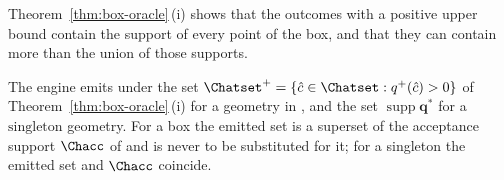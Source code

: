 
Theorem~\ref{thm:box-oracle}\,(i) shows that the outcomes with a positive upper bound
contain the support of every point of the box, and that they can contain more
than the union of those supports.

\begin{requirement}\label{req:acceptance-support}
The engine emits under  the set
$\Chatset^{+}=\{\hat c\in\Chatset:q^{+}(\hat c)>0\}$ of
Theorem~\ref{thm:box-oracle}\,(i) for a geometry in , and
the set $\operatorname{supp}\mathbf{q}^{\ast}$ for a $\mathrm{singleton}$
geometry. For a box the emitted set is a superset of the acceptance support
$\Chacc$ of  and is never to be
substituted for it; for a singleton the emitted set and $\Chacc$ coincide.
\end{requirement}
